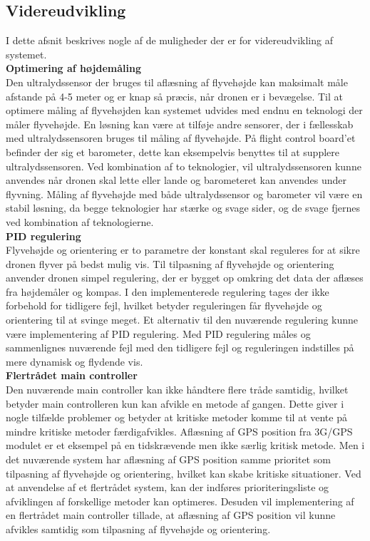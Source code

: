 \newpage

\subsection{Videreudvikling}

I dette afsnit beskrives nogle af de muligheder der er for videreudvikling af systemet.  \\

\textbf{Optimering af højdemåling}\\
Den ultralydssensor der bruges til aflæsning af flyvehøjde kan maksimalt måle afstande på 4-5 meter og er knap så præcis, når dronen er i bevægelse. 
Til at optimere måling af flyvehøjden kan systemet udvides med endnu en teknologi der måler flyvehøjde. En løsning kan være at tilføje andre sensorer, der i fællesskab med ultralydssensoren bruges til måling af flyvehøjde. 
På flight control board'et befinder der sig et barometer, dette kan eksempelvis benyttes til at supplere ultralydssensoren.
Ved kombination af to teknologier, vil ultralydssensoren kunne anvendes når dronen skal lette eller lande og barometeret kan anvendes under flyvning. 
Måling af flyvehøjde med både ultralydssensor og barometer vil være en stabil løsning, da begge teknologier har stærke og svage sider, og de svage fjernes ved kombination af teknologierne.\\


\textbf{PID regulering}\\
Flyvehøjde og orientering er to parametre der konstant skal reguleres for at sikre dronen flyver på bedst mulig vis. Til tilpasning af flyvehøjde og orientering anvender dronen simpel regulering, der er bygget op omkring det data der aflæses fra højdemåler og kompas.
I den implementerede regulering tages der ikke forbehold for tidligere fejl, hvilket betyder reguleringen får flyvehøjde og orientering til at svinge meget. 
Et alternativ til den nuværende regulering kunne være implementering af PID regulering. Med PID regulering måles og sammenlignes nuværende fejl med den tidligere fejl og reguleringen indstilles på mere dynamisk og flydende vis. \\


\textbf{Flertrådet main controller} \\
Den nuværende main controller kan ikke håndtere flere tråde samtidig, hvilket betyder main controlleren kun kan afvikle en metode af gangen. Dette giver i nogle tilfælde problemer og betyder at kritiske metoder komme til at vente på mindre kritiske metoder færdigafvikles. Aflæsning af GPS position fra 3G/GPS modulet er et eksempel på en tidskrævende men ikke særlig kritisk metode. Men i det nuværende system har aflæsning af GPS position samme prioritet som tilpasning af flyvehøjde og orientering, hvilket kan skabe kritiske situationer. Ved at anvendelse af et flertrådet system, kan der indføres prioriteringsliste og afviklingen af forskellige metoder kan optimeres. Desuden vil implementering af en flertrådet main controller tillade, at aflæsning af GPS position vil kunne afvikles samtidig som tilpasning af flyvehøjde og orientering. \\

